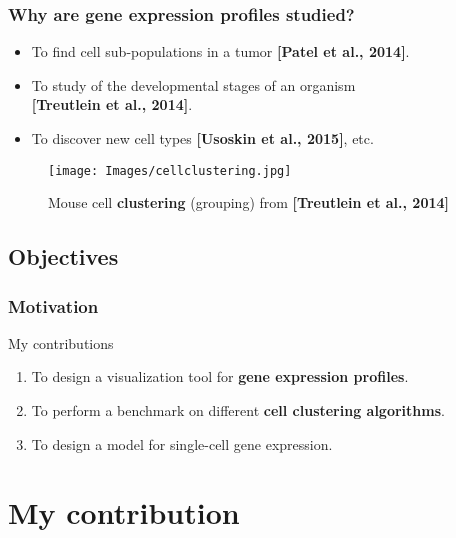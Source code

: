 \documentclass{beamer}
\begin{document}
\begin{frame}
\frametitle{Why are gene expression profiles studied?}

\begin{itemize}[<+>]
\item To find cell sub-populations in a tumor \textbf{[Patel et al., 2014]}.
\item To study of the developmental stages of an organism\\ \textbf{[Treutlein et al., 2014]}.
\item To discover new cell types \textbf{[Usoskin et al., 2015]}, etc.
\end{itemize}

\begin{figure}
\texttt{[image: Images/cellclustering.jpg]}
\caption{Mouse cell \textbf{clustering} (grouping) from \textbf{[Treutlein et al., 2014]}}
\end{figure}

\end{frame}

\subsection{Objectives}

\begin{frame}
\tableofcontents[currentsubsection]
\end{frame}

\begin{frame}
\frametitle{Motivation}

\begin{alertblock}{My contributions}
\bigskip
\begin{enumerate}[<+>]
\item To design a visualization tool for \textbf{gene expression profiles}.
\item To perform a benchmark on different \textbf{cell clustering algorithms}.
\item To design a model for single-cell gene expression. 
\end{enumerate}
\bigskip
\end{alertblock}

\end{frame}

\section{My contribution}

\begin{frame}
\tableofcontents[currentsection]
\end{frame}
\end{document}
